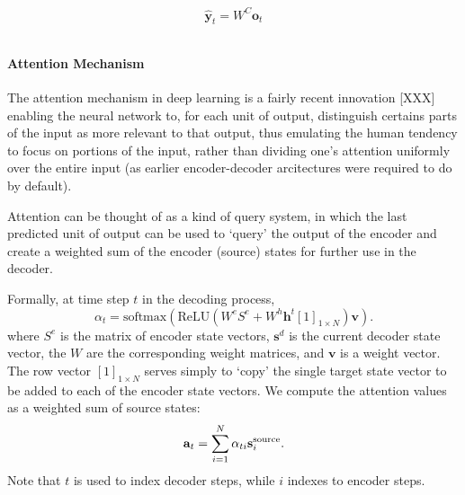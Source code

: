 $$ \hat{\textbf{y}}_t = W^C \textbf{o}_t $$

$$  $$

\paragraph{Attention Mechanism} %
The attention mechanism in deep learning is a fairly recent innovation [XXX]
enabling the neural network to, for each unit of output, distinguish 
certains parts of the input as more relevant to that output, thus emulating the 
human tendency to focus on portions of the input, rather than dividing one's attention
uniformly over the entire input (as earlier encoder-decoder arcitectures were required 
to do by default).

Attention can be thought of as a kind of query system, in which the last predicted
unit of output can be used to `query' the output of the encoder and create a weighted
sum of the encoder (source) states for further use in the decoder.

Formally, at time step $t$ in the decoding process,
$$ \alpha_t = \textrm{softmax}\left( \textrm{ReLU}( W^e S^e + W^h \textbf{h}^t [1]_{1 \times N} ) \textbf{v} \right). $$
where $S^e$ is the matrix of encoder state vectors, 
$\textbf{s}^d$ is the current decoder state vector, the $W$ are the corresponding 
weight matrices, and $\textbf{v}$ is a weight vector. 
The row vector $[1]_{1 \times N}$ serves simply to `copy' the single target state vector 
to be added to each of the encoder state vectors.
We compute the attention values as a weighted sum of source states:
$$ \textbf{a}_t = \sum\limits_{i=1}^{N} \alpha_{ti} \textbf{s}_i^{\tiny \textrm{source}}. $$
Note that $t$ is used to index decoder steps, while $i$ indexes to encoder steps.

